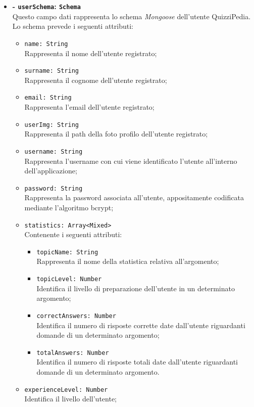 \begin{itemize}
\begin{itemize}
			\item \textbf{- \texttt{userSchema}: \texttt{Schema}} \\
			Questo campo dati rappresenta lo schema \textit{Mongoose} dell'utente QuizziPedia. Lo schema prevede i seguenti attributi:
			\begin{itemize}
				\item 
					\texttt{name: String}\\ Rappresenta il nome  dell'utente registrato;
				\item 
					\texttt{surname: String}\\ Rappresenta il cognome  dell'utente registrato;
				\item 
					\texttt{email: String}\\ Rappresenta l'email  dell'utente registrato;
				\item 
					\texttt{userImg: String}\\ Rappresenta il path della foto profilo dell'utente registrato;
				\item 
					\texttt{username: String}\\ Rappresenta l'username con cui viene identificato l'utente all'interno dell'applicazione;		
				\item
					\texttt{password: String}\\ Rappresenta la password associata all'utente,  appositamente codificata mediante l'algoritmo bcrypt;  		
				\item
					\texttt{statistics: Array<Mixed>}\\ Contenente i seguenti attributi:
				\begin{itemize}
					\item
						\texttt{topicName: String}\\ Rappresenta il nome della statistica relativa all'argomento;	 
					\item
						 \texttt{topicLevel: Number}\\ Identifica il livello di preparazione dell'utente in un determinato argomento;
					\item
						\texttt{correctAnswers: Number}\\ Identifica il numero di risposte corrette date dall'utente riguardanti domande di un determinato argomento; 
					\item						
						 \texttt{totalAnswers: Number} \\ Identifica il numero di risposte totali date dall'utente riguardanti domande di un determinato argomento.		
				\end{itemize}		
				\item 
					\texttt{experienceLevel: Number}\\ Identifica il livello dell'utente;				
				

\end{itemize}
\end{itemize}
\end{itemize}
